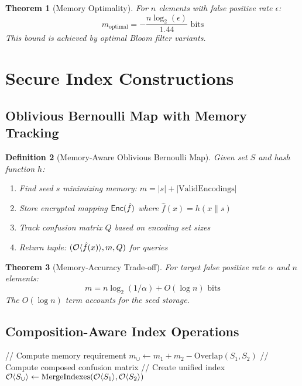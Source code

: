 \documentclass[11pt,final]{article}
\newtheorem{theorem}{Theorem}[section]
\newtheorem{definition}[theorem]{Definition}
\begin{document}
\begin{theorem}[Memory Optimality]
For $n$ elements with false positive rate $\epsilon$:
\begin{equation}
m_{\text{optimal}} = -\frac{n \log_2(\epsilon)}{1.44} \text{ bits}
\end{equation}
This bound is achieved by optimal Bloom filter variants.
\end{theorem}

\section{Secure Index Constructions}

\subsection{Oblivious Bernoulli Map with Memory Tracking}

\begin{definition}[Memory-Aware Oblivious Bernoulli Map]
Given set $S$ and hash function $h$:
\begin{enumerate}
    \item Find seed $s$ minimizing memory: $m = |s| + |\text{ValidEncodings}|$
    \item Store encrypted mapping $\mathsf{Enc}(\hat{f})$ where $\hat{f}(x) = h(x \| s)$
    \item Track confusion matrix $Q$ based on encoding set sizes
    \item Return tuple: $(\mathcal{O}\langle \hat{f}(x) \rangle, m, Q)$ for queries
\end{enumerate}
\end{definition}

\begin{theorem}[Memory-Accuracy Trade-off]
For target false positive rate $\alpha$ and $n$ elements:
\begin{equation}
m = n \log_2(1/\alpha) + O(\log n) \text{ bits}
\end{equation}
The $O(\log n)$ term accounts for the seed storage.
\end{theorem}

\subsection{Composition-Aware Index Operations}

\begin{algorithm}[H]
\caption{Memory-Aware Set Union}
// Compute memory requirement\;
$m_{\cup} \gets m_1 + m_2 - \text{Overlap}(S_1, S_2)$\;
// Compute composed confusion matrix\;
// Create unified index\;
$\mathcal{O}\langle S_{\cup} \rangle \gets \text{MergeIndexes}(\mathcal{O}\langle S_1 \rangle, \mathcal{O}\langle S_2 \rangle)$\;
\end{algorithm}
\end{document}
